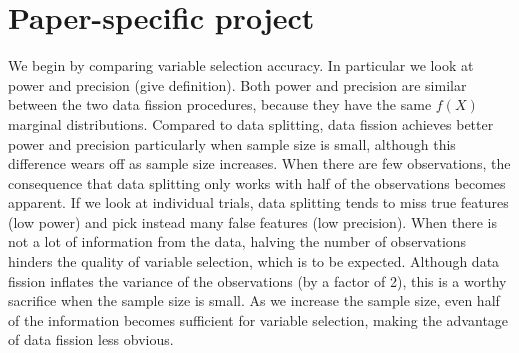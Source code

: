 \section{Paper-specific project}\label{sec:project}

%
%
%
%
%
%
%
%
%
%

We begin by comparing variable selection accuracy. In particular we look at power and precision (give definition). Both power and precision are similar between the two data fission procedures, because they have the same $f(X)$ marginal distributions. Compared to data splitting, data fission achieves better power and precision particularly when sample size is small, although this difference wears off as sample size increases. When there are few observations, the consequence that data splitting only works with half of the observations becomes apparent. If we look at individual trials, data splitting tends to miss true features (low power) and pick instead many false features (low precision). When there is not a lot of information from the data, halving the number of observations hinders the quality of variable selection, which is to be expected. Although data fission inflates the variance of the observations (by a factor of 2), this is a worthy sacrifice when the sample size is small. As we increase the sample size, even half of the information becomes sufficient for variable selection, making the advantage of data fission less obvious.

